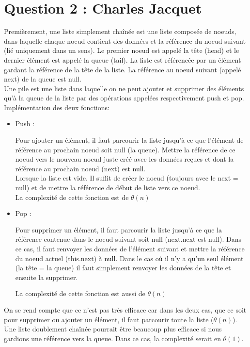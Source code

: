 \section*{Question 2 : Charles Jacquet}
Premièrement, une liste simplement chaînée est une liste composée de noeuds, dans laquelle chaque noeud contient des données et la référence du noeud suivant (lié uniquement dans un sens). Le premier noeud est appelé la tête (head) et le dernier élément est appelé la queue (tail). La liste est référencée par un élément gardant la référence de la tête de la liste. La référence au noeud suivant (appelé next) de la queue est null.\\
Une pile est une liste dans laquelle on ne peut ajouter et supprimer des éléments qu'à la queue de la liste par des opérations appelées respectivement push et pop.\\
Implémentation des deux fonctions:
\begin{itemize}
\item {Push :}

Pour ajouter un élément, il faut parcourir la liste jusqu'à ce que l'élément de référence au prochain noeud soit null (la queue). Mettre la référence de ce noeud vers le nouveau noeud juste créé avec les données reçues et dont la référence au prochain noeud (next) est null.\\
Lorsque la liste est vide. Il suffit de créer le noeud (toujours avec le next = null) et de mettre la référence de début de liste vers ce noeud.\\
La complexité de cette fonction est de $\theta (n) $
\item {Pop : }

Pour supprimer un élément, il faut parcourir la liste jusqu'à ce que la référence contenue dans le noeud suivant soit null (next.next est null). Dans ce cas, il faut renvoyer les données de l'élément suivant et mettre la référence du noeud actuel (this.next) à null. 
Dans le cas où il n'y a qu'un seul élément (la tête = la queue) il faut simplement renvoyer les données de la tête et ensuite la supprimer.

La complexité de cette fonction est aussi de $\theta (n) $
\end{itemize}

On se rend compte que ce n'est pas très efficace car dans les deux cas, que ce soit pour supprimer ou ajouter un élément, il faut parcourir toute la liste ($\theta (n)$). 
Une liste doublement chaînée pourrait être beaucoup plus efficace si nous gardions une référence vers la queue. Dans ce cas, la complexité serait en $\theta (1)$.
